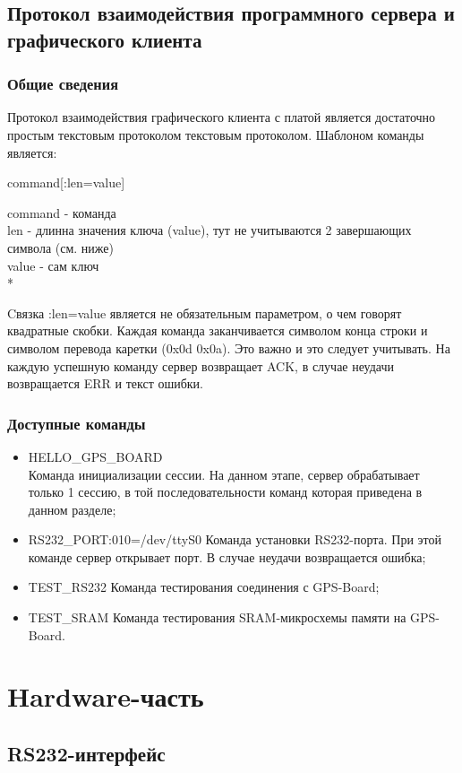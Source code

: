 \subsection{Протокол взаимодействия программного сервера и графического клиента}
\subsubsection{Общие сведения}
Протокол взаимодействия графического клиента с платой является достаточно простым текстовым протоколом текстовым протоколом. Шаблоном
команды является:
\begin{center}
command[:len=value]
\end{center}
command - команда \\
len - длинна значения ключа (value), тут не учитываются 2 завершающих символа (см. ниже)\\
value - сам ключ \\*

Cвязка :len=value является не обязательным параметром, о чем говорят квадратные скобки. Каждая команда заканчивается символом конца строки
и символом перевода каретки (0x0d 0x0a). Это важно и это следует учитывать. На каждую успешную команду сервер возвращает ACK, в случае
неудачи возвращается ERR и текст ошибки.

\subsubsection{Доступные команды}
\begin{itemize}
\item HELLO\_GPS\_BOARD \\
Команда инициализации сессии. На данном этапе, сервер обрабатывает только 1 сессию, в той последовательности команд которая приведена в 
данном разделе;
\item RS232\_PORT:010=/dev/ttyS0
Команда установки RS232-порта. При этой команде сервер открывает порт. В случае неудачи возвращается ошибка;
\item TEST\_RS232
Команда тестирования соединения с GPS-Board;
\item TEST\_SRAM
Команда тестирования SRAM-микросхемы памяти на GPS-Board.
\end{itemize}

\section{Hardware-часть}

\subsection{RS232-интерфейс}
